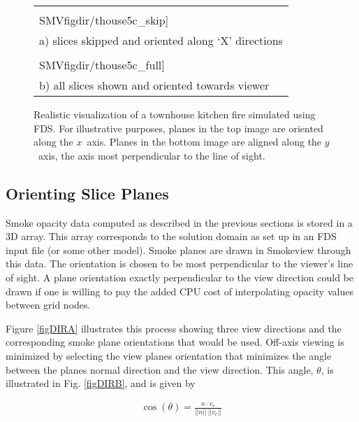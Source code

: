 {\begin{figure}[bph]
\begin{center}
\begin{tabular}{l}
\texttt{[image: \\SMVfigdir/thouse5c\_skip]}\\
a) slices skipped and oriented along `X' directions\\
\texttt{[image: \\SMVfigdir/thouse5c\_full]}\\
b) all slices shown and oriented towards viewer \\
\end{tabular}
\end{center}
\caption[Realistic visualization of a townhouse kitchen fire
simulated using FDS.]{Realistic visualization of a townhouse
kitchen fire simulated using FDS. For illustrative purposes,
planes in the top image are oriented along the $x$~axis.  Planes
in the bottom image are aligned along the $y$~axis, the axis most
perpendicular to the line of sight.}
\label{figsmoke3d}%
\end{figure}


\subsection{Orienting Slice Planes}

Smoke opacity data computed as described in the previous sections
is stored in a 3D array. This array corresponds to the solution
domain as set up in an FDS input file (or some other model). Smoke
planes are drawn in Smokeview through this data.  The orientation
is chosen to be most perpendicular to the viewer's line of sight.
A plane orientation exactly perpendicular to the view direction
could be drawn if one is willing to pay the added CPU cost of
interpolating opacity values between grid nodes.

Figure \ref{figDIRA} illustrates this process showing three view
directions and the corresponding smoke plane orientations that
would be used. Off-axis viewing is minimized by selecting the view
planes orientation that minimizes the angle between the planes
normal direction and the view direction. This angle, $\theta$, is
illustrated in Fig. \ref{figDIRB}, and is given by

\begin{eqnarray}
\cos(\theta)=\frac{n\cdot v_e}{||n||~||v_e||}
\end{eqnarray}

}
